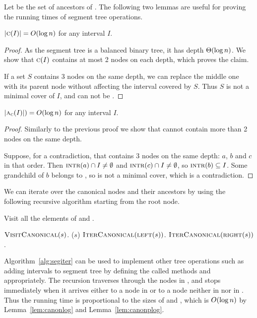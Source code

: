 \documentclass[english,gradu]{tktltiki2018}
\begin{document}
Let  be the set of ancestors of .
The following two lemmas are useful for proving the running times of segment tree operations.

\begin{lem}\label{lem:canonlog}$\left |\textsc{c}(I)\right |=O(\log n)$ for any interval $I$.\end{lem}
\begin{proof}
As the segment tree is a balanced binary tree, it has depth $\Theta(\log n)$.
We show that $\textsc{c}(I)$ contains at most 2 nodes on each depth, which proves the claim.

If a set $S$ contains 3 nodes on the same depth, we can replace the middle one with its parent node without affecting the interval covered by $S$.
Thus $S$ is not a minimal cover of $I$, and can not be .
\end{proof}

\begin{lem}\label{lem:canonplog}$\left |\textsc{a}_{\textsc{c}}(I)\right |)=O(\log n)$ for any interval $I$.\end{lem}
\begin{proof}
Similarly to the previous proof we show that  cannot contain more than 2 nodes on the same depth.

Suppose, for a contradiction, that  contains 3 nodes on the same depth: $a$, $b$ and $c$ in that order.
Then $\textsc{intr}(a)\cap I\neq\emptyset$ and $\textsc{intr}(c)\cap I\neq\emptyset$, so $\textsc{intr}(b)\subseteq I$.
Some grandchild of $b$ belongs to , so  is not a minimal cover, which is a contradiction.
\end{proof}

We can iterate over the canonical nodes and their ancestors by using the following recursive algorithm starting from the root node.

\begin{alg}\label{alg:segiter}
Visit all the elements of  and .
\begin{algorithmic}
		\State $\textsc{VisitCanonical}(s)$.
		\State \visitp($s$)
		\State $\textsc{IterCanonical}(\textsc{left}(s))$.
		\State $\textsc{IterCanonical}(\textsc{right}(s))$.
	\EndIf
\EndProcedure
\end{algorithmic}
\end{alg}

Algorithm~\ref{alg:segiter} can be used to implement other tree operations such as adding intervals to segment tree by defining the called methods \visitc and \visitp appropriately.
The recursion traverses through the nodes in , and stops immediately when it arrives either to a node in  or to a node neither in  nor in .
Thus the running time is proportional to the sizes of  and , which is $O(\log n)$ by Lemma~\ref{lem:canonlog} and Lemma~\ref{lem:canonplog}.
\end{document}
